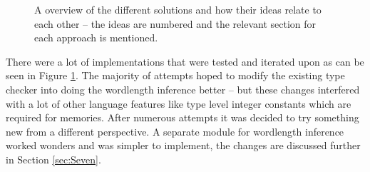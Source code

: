 \begin{figure}[h!]
  \caption{A overview of the different solutions and how their ideas relate to each other -- the ideas are numbered and the relevant section for each approach is mentioned.}
  \label{fig:taxonomy}
\end{figure}

There were a lot of implementations that were tested and iterated upon as can be seen in Figure \ref{fig:taxonomy}. The majority of attempts hoped to modify the existing type checker into doing the wordlength inference better -- but these changes interfered with a lot of other language features like type level integer constants which are required for memories. After numerous attempts it was decided to try something new from a different perspective. A separate module for wordlength inference worked wonders and was simpler to implement, the changes are discussed further in Section \ref{sec:Seven}.


